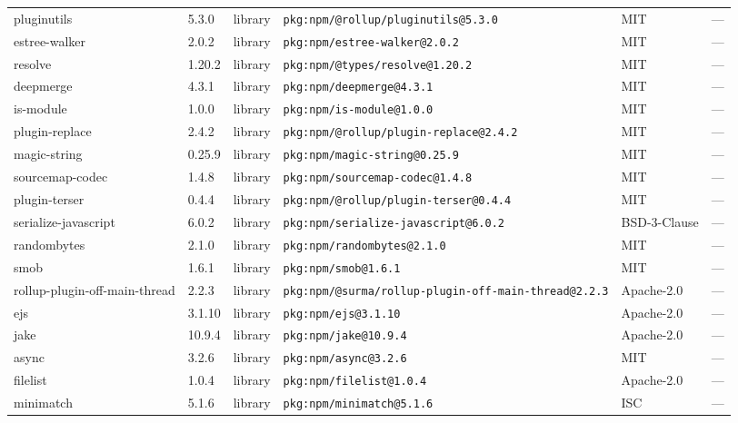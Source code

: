 \documentclass[11pt,a4paper]{article}
\begin{document}
\begin{longtable}{|p{4cm}|p{2cm}|p{1.6cm}|p{5cm}|p{1.5cm}|p{3.5cm}|}
\raggedright pluginutils & 5.3.0 & library & \small\texttt{pkg:npm/@rollup/pluginutils@5.3.0} & MIT & \small — \\
\raggedright estree-walker & 2.0.2 & library & \small\texttt{pkg:npm/estree-walker@2.0.2} & MIT & \small — \\
\raggedright resolve & 1.20.2 & library & \small\texttt{pkg:npm/@types/resolve@1.20.2} & MIT & \small — \\
\raggedright deepmerge & 4.3.1 & library & \small\texttt{pkg:npm/deepmerge@4.3.1} & MIT & \small — \\
\raggedright is-module & 1.0.0 & library & \small\texttt{pkg:npm/is-module@1.0.0} & MIT & \small — \\
\raggedright plugin-replace & 2.4.2 & library & \small\texttt{pkg:npm/@rollup/plugin-replace@2.4.2} & MIT & \small — \\
\raggedright magic-string & 0.25.9 & library & \small\texttt{pkg:npm/magic-string@0.25.9} & MIT & \small — \\
\raggedright sourcemap-codec & 1.4.8 & library & \small\texttt{pkg:npm/sourcemap-codec@1.4.8} & MIT & \small — \\
\raggedright plugin-terser & 0.4.4 & library & \small\texttt{pkg:npm/@rollup/plugin-terser@0.4.4} & MIT & \small — \\
\raggedright serialize-javascript & 6.0.2 & library & \small\texttt{pkg:npm/serialize-javascript@6.0.2} & BSD-3-Clause & \small — \\
\raggedright randombytes & 2.1.0 & library & \small\texttt{pkg:npm/randombytes@2.1.0} & MIT & \small — \\
\raggedright smob & 1.6.1 & library & \small\texttt{pkg:npm/smob@1.6.1} & MIT & \small — \\
\raggedright rollup-plugin-off-main-thread & 2.2.3 & library & \small\texttt{pkg:npm/@surma/rollup-plugin-off-main-thread@2.2.3} & Apache-2.0 & \small — \\
\raggedright ejs & 3.1.10 & library & \small\texttt{pkg:npm/ejs@3.1.10} & Apache-2.0 & \small — \\
\raggedright jake & 10.9.4 & library & \small\texttt{pkg:npm/jake@10.9.4} & Apache-2.0 & \small — \\
\raggedright async & 3.2.6 & library & \small\texttt{pkg:npm/async@3.2.6} & MIT & \small — \\
\raggedright filelist & 1.0.4 & library & \small\texttt{pkg:npm/filelist@1.0.4} & Apache-2.0 & \small — \\
\raggedright minimatch & 5.1.6 & library & \small\texttt{pkg:npm/minimatch@5.1.6} & ISC & \small — \\

\end{longtable}
\end{document}
